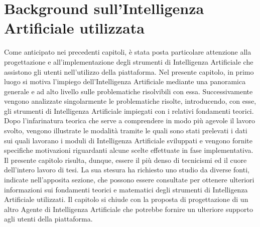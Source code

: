 \chapter{Background sull'Intelligenza Artificiale utilizzata} %
%

\begin{citazione}
Come anticipato nei precedenti capitoli, è stata posta particolare attenzione alla progettazione e all'implementazione degli strumenti di Intelligenza Artificiale che assistono gli utenti nell'utilizzo della piattaforma. Nel presente capitolo, in primo luogo si motiva l'impiego dell'Intelligenza Artificiale mediante una panoramica generale e ad alto livello sulle problematiche risolvibili con essa. Successivamente vengono analizzate singolarmente le problematiche risolte, introducendo, con esse, gli strumenti di Intelligenza Artificiale impiegati con i relativi fondamenti teorici. Dopo l'infarinatura teorica che serve a comprendere in modo più agevole il lavoro svolto, vengono illustrate le modalità tramite le quali sono stati prelevati i dati sui quali lavorano i moduli di Intelligenza Artificiale sviluppati e vengono fornite specifiche motivazioni riguardanti alcune scelte effettuate in fase implementativa. Il presente capitolo risulta, dunque, essere il più denso di tecnicismi ed il cuore dell'intero lavoro di tesi. La sua stesura ha richiesto uno studio da diverse fonti, indicate nell'apposita sezione, che possono essere consultate per ottenere ulteriori informazioni sui fondamenti teorici e matematici degli strumenti di Intelligenza Artificiale utilizzati. Il capitolo si chiude con la proposta di progettazione di un altro Agente di Intelligenza Artificiale che potrebbe fornire un ulteriore supporto agli utenti della piattaforma.
\end{citazione}
\newpage

